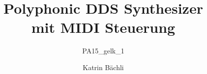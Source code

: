\documentclass[ngerman]{zhawines}
\begin{document}
	\author{Katrin Bächli }%
	\renewcommand{\betreuer}{Prof. Hans-Joachim Gelke}
	\renewcommand{\nebenbetreuer}{Dr. Matthias Rosenthal}
	\title{Polyphonic DDS Synthesizer\\ mit MIDI Steuerung}
	\subtitle{PA15\_gelk\_1}


	\maketitle{}
	
	\headings
	
	
			
			
		
	
	
	\tableofcontents				
			
	 	
	 	 
	 	
	
	
	
		
	

	
\end{document}
